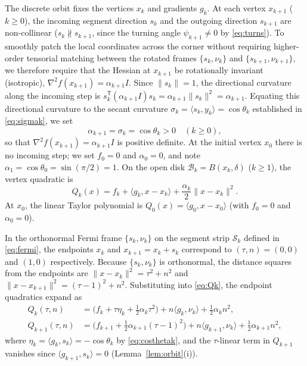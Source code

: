 \documentclass[11pt]{article}
\newcommand{\ip}[2]{\langle #1,#2\rangle}
\begin{document}
The discrete orbit fixes the vertices $x_k$ and gradients $g_k$.
At each vertex $x_{k+1}$ ($k \ge 0$), the incoming segment direction $s_k$ and the outgoing direction $s_{k+1}$ are non-collinear ($s_k \not\parallel s_{k+1}$, since the turning angle $\psi_{k+1} \ne 0$ by \eqref{eq:turns}).
To smoothly patch the local coordinates across the corner without requiring higher-order tensorial matching between the rotated frames $\{s_k, \nu_k\}$ and $\{s_{k+1}, \nu_{k+1}\}$, we therefore require that the Hessian at $x_{k+1}$ be rotationally invariant (isotropic), $\nabla^2 f(x_{k+1}) = \alpha_{k+1} I$.
Since $\|s_k\|=1$, the directional curvature along the incoming step is $s_k^{\mathsf T}(\alpha_{k+1} I)s_k = \alpha_{k+1}\|s_k\|^2 = \alpha_{k+1}$.
Equating this directional curvature to the secant curvature $\sigma_k = \ip{s_k}{y_k} = \cos\theta_k$ established in \eqref{eq:sigmak}, we set
\begin{equation}
\label{eq:alphak}
\alpha_{k+1} = \sigma_k = \cos\theta_k > 0 \quad (k \ge 0),
\end{equation}
so that $\nabla^2 f(x_{k+1}) = \alpha_{k+1} I$ is positive definite. At the initial vertex $x_0$ there is no incoming step; we set $f_0 = 0$ and $\alpha_0 = 0$, and note $\alpha_1 = \cos\theta_0 = \sin(\pi/2) = 1$.
On the open disk $\mathcal B_k = B(x_k, \delta)$ ($k \ge 1$), the vertex quadratic is
\begin{equation}
\label{eq:Qk}
Q_k(x) = f_k + \ip{g_k}{x-x_k} + \frac{\alpha_k}{2}\|x-x_k\|^2.
\end{equation}
At $x_0$, the linear Taylor polynomial is $Q_0(x) = \ip{g_0}{x-x_0}$ (with $f_0 = 0$ and $\alpha_0 = 0$).

In the orthonormal Fermi frame $\{s_k, \nu_k\}$ on the segment strip $\mathcal S_k$ defined in \eqref{eq:fermi}, the endpoints $x_k$ and $x_{k+1} = x_k + s_k$ correspond to $(\tau, n) = (0, 0)$ and $(1, 0)$ respectively.
Because $\{s_k, \nu_k\}$ is orthonormal, the distance squares from the endpoints are $\|x-x_k\|^2 = \tau^2 + n^2$ and $\|x-x_{k+1}\|^2 = (\tau-1)^2 + n^2$.
Substituting into \eqref{eq:Qk}, the endpoint quadratics expand as
\begin{align}
Q_k(\tau, n) &= \bigl(f_k + \tau\eta_k + \tfrac12\alpha_k\tau^2\bigr) + n\ip{g_k}{\nu_k} + \tfrac12\alpha_k n^2, \label{eq:aleft}\\
Q_{k+1}(\tau, n) &= \bigl(f_{k+1} + \tfrac12\alpha_{k+1}(\tau-1)^2\bigr) + n\ip{g_{k+1}}{\nu_k} + \tfrac12\alpha_{k+1} n^2, \label{eq:aright}
\end{align}
where $\eta_k = \ip{g_k}{s_k} = -\cos\theta_k$ by \eqref{eq:costhetak}, and the $\tau$-linear term in $Q_{k+1}$ vanishes since $\ip{g_{k+1}}{s_k} = 0$ (Lemma~\ref{lem:orbit}(i)).
\end{document}
